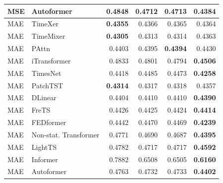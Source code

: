 \begin{longtable}{llrrrr}
MSE & Autoformer & 0.4848 & 0.4712 & 0.4713 & \textbf{0.4384} \\
\midrule
MAE & TimeXer & \textbf{0.4355} & 0.4366 & 0.4365 & 0.4364 \\
MAE & TimeMixer & \textbf{0.4305} & 0.4313 & 0.4314 & 0.4363 \\
MAE & PAttn & 0.4403 & 0.4395 & \textbf{0.4394} & 0.4430 \\
MAE & iTransformer & 0.4833 & 0.4801 & 0.4794 & \textbf{0.4506} \\
MAE & TimesNet & 0.4418 & 0.4485 & 0.4473 & \textbf{0.4258} \\
MAE & PatchTST & \textbf{0.4314} & 0.4317 & 0.4318 & 0.4357 \\
MAE & DLinear & 0.4404 & 0.4410 & 0.4410 & \textbf{0.4390} \\
MAE & FreTS & 0.4426 & 0.4425 & 0.4424 & \textbf{0.4414} \\
MAE & FEDformer & 0.4442 & 0.4470 & 0.4469 & \textbf{0.4239} \\
MAE & Non-stat. Transformer & 0.4771 & 0.4690 & 0.4687 & \textbf{0.4395} \\
MAE & LightTS & 0.4782 & 0.4717 & 0.4717 & \textbf{0.4592} \\
MAE & Informer & 0.7882 & 0.6508 & 0.6505 & \textbf{0.6160} \\
MAE & Autoformer & 0.4763 & 0.4732 & 0.4733 & \textbf{0.4402} \\
\end{longtable}
\endgroup


